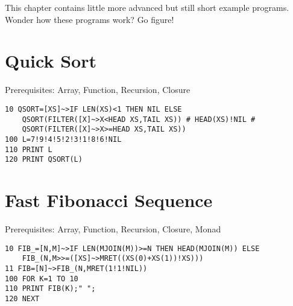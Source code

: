 This chapter contains little more advanced but still short example programs. Wonder how these programs work? Go figure!

\section{Quick Sort}

Prerequisites: Array, Function, Recursion, Closure

\begin{lstlisting}
10 QSORT=[XS]~>IF LEN(XS)<1 THEN NIL ELSE 
    QSORT(FILTER([X]~>X<HEAD XS,TAIL XS)) # HEAD(XS)!NIL # 
    QSORT(FILTER([X]~>X>=HEAD XS,TAIL XS))
100 L=7!9!4!5!2!3!1!8!6!NIL
110 PRINT L
120 PRINT QSORT(L)
\end{lstlisting}

\section{Fast Fibonacci Sequence}

Prerequisites: Array, Function, Recursion, Closure, Monad

\begin{lstlisting}
10 FIB_=[N,M]~>IF LEN(MJOIN(M))>=N THEN HEAD(MJOIN(M)) ELSE
    FIB_(N,M>>=([XS]~>MRET((XS(0)+XS(1))!XS)))
11 FIB=[N]~>FIB_(N,MRET(1!1!NIL))
100 FOR K=1 TO 10
110 PRINT FIB(K);" ";
120 NEXT
\end{lstlisting}
